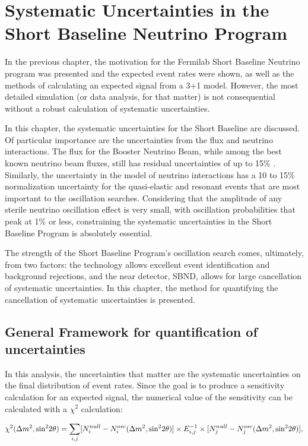 \chapter{Systematic Uncertainties in the Short Baseline Neutrino Program}

In the previous chapter, the motivation for the Fermilab Short Baseline Neutrino program was presented and the expected event rates were shown, as well as the methods of calculating an expected signal from a 3+1 model.  However, the most detailed simulation (or data analysis, for that matter) is not consequential without a robust calculation of systematic uncertainties.

In this chapter, the systematic uncertainties for the Short Baseline are discussed.  Of particular importance are the uncertainties from the flux and neutrino interactions.  The flux for the Booster Neutrino Beam, while among the best known neutrino beam fluxes, still has residual uncertainties of up to 15\% \cite{miniboone_flux_paper}.  Similarly, the uncertainty in the model of neutrino interactions has a 10 to 15\% normalization uncertainty for the quasi-elastic and resonant events that are most important to the oscillation searches.  Considering that the amplitude of any sterile neutrino oscillation effect is very small, with oscillation probabilities that peak at 1\% or less, constraining the systematic uncertainties in the Short Baseline Program is absolutely essential.

The strength of the Short Baseline Program's oscillation search comes, ultimately, from two factors:  the \lartpc technology allows excellent event identification and background rejections, and the near detector, SBND, allows for large cancellation of systematic uncertainties.  In this chapter, the method for quantifying the cancellation of systematic uncertainties is presented.


\section{General Framework for quantification of uncertainties}

In this analysis, the uncertainties that matter are the systematic uncertainties on the final distribution of event rates.  Since the goal is to produce a sensitivity calculation for an expected signal, the numerical value of the sensitivity can be calculated with a $\chi^2$ calculation:

\begin{equation}
\begin{centering}
\chi^2(\Delta m^2, \text{sin}^2 2 \theta ) = \sum_{i,j} [N^{null}_i - N^{osc}_i(\Delta m^2, \text{sin}^2 2 \theta ) ] \times E^{-1}_{i,j} \times [N^{null}_j - N^{osc}_j(\Delta m^2, \text{sin}^2 2 \theta ) ],
\end{centering}
\end{equation}


